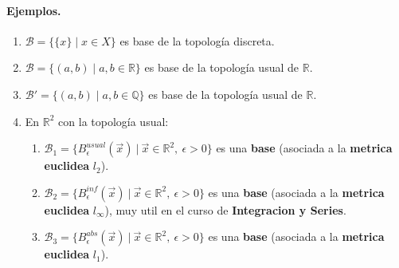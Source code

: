 \paragraph{Ejemplos.}
\begin{enumerate}
  \item $\mathcal{B}=\bigl\{\{x\}\mid x\in X\bigr\}$ es base de la
        topología discreta.
  \item $\mathcal{B}=\bigl\{(a,b)\mid a,b\in\mathbb{R}\bigr\}$ es base
        de la topología usual de $\mathbb{R}$.
  \item $\mathcal{B}'=\bigl\{(a,b)\mid a,b\in\mathbb{Q}\bigr\}$ es base
        de la topología usual de $\mathbb{R}$.
  \item En $\mathbb{R}^2$ con la topología usual:
  \begin{enumerate}[label=\alph*)]
    \item  \( \mathcal{B}_1 =  \{ B_\epsilon^{usual}(\vec{x}) \ | \ \vec{x} \in \mathbb{R}^2, \ \epsilon >0 \} \) es una \textbf{base} (asociada a la \textbf{metrica euclidea} \( l_2 \)). 
    \item \( \mathcal{B}_2 =  \{ B_\epsilon^{inf}(\vec{x}) \ | \ \vec{x} \in \mathbb{R}^2, \ \epsilon >0 \} \) es una \textbf{base} (asociada a la \textbf{metrica euclidea} \( l_\infty \)), muy util en el curso de \textbf{Integracion y Series}.
    \item  \( \mathcal{B}_3 =  \{ B_\epsilon^{abs}(\vec{x}) \ | \ \vec{x} \in \mathbb{R}^2, \ \epsilon >0 \} \) es una \textbf{base} (asociada a la \textbf{metrica euclidea} \( l_1 \)). 
  \end{enumerate}
\end{enumerate}

